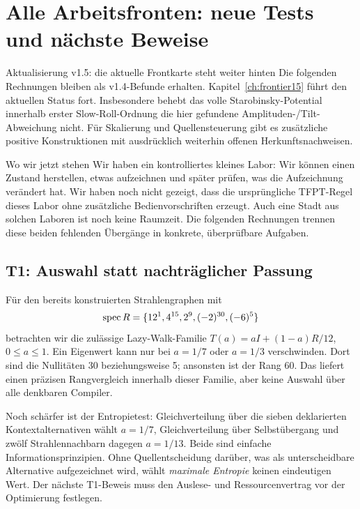 \chapter{Alle Arbeitsfronten: neue Tests und nächste Beweise}
\label{ch:fronts14}
\begin{grenze}{Aktualisierung v1.5: die aktuelle Frontkarte steht weiter hinten}
Die folgenden Rechnungen bleiben als v1.4-Befunde erhalten. Kapitel~\ref{ch:frontier15} führt den aktuellen Status fort. Insbesondere behebt das volle Starobinsky-Potential innerhalb erster Slow-Roll-Ordnung die hier gefundene Amplituden-/Tilt-Abweichung nicht. Für Skalierung und Quellensteuerung gibt es zusätzliche positive Konstruktionen mit ausdrücklich weiterhin offenen Herkunftsnachweisen.
\end{grenze}

\begin{bild}{Wo wir jetzt stehen}
Wir haben ein kontrolliertes kleines Labor: Wir können einen Zustand herstellen, etwas aufzeichnen und später prüfen, was die Aufzeichnung verändert hat. Wir haben noch nicht gezeigt, dass die ursprüngliche TFPT-Regel dieses Labor ohne zusätzliche Bedienvorschriften erzeugt. Auch eine Stadt aus solchen Laboren ist noch keine Raumzeit. Die folgenden Rechnungen trennen diese beiden fehlenden Übergänge in konkrete, überprüfbare Aufgaben.
\end{bild}

\section{T1: Auswahl statt nachträglicher Passung}
Für den bereits konstruierten Strahlengraphen mit
\begin{equation}
\operatorname{spec} R=\{12^1,4^{15},2^9,(-2)^{30},(-6)^5\}
\end{equation}
betrachten wir die zulässige Lazy-Walk-Familie $T(a)=aI+(1-a)R/12$, $0\le a\le1$. Ein Eigenwert kann nur bei $a=1/7$ oder $a=1/3$ verschwinden. Dort sind die Nullitäten 30 beziehungsweise 5; ansonsten ist der Rang 60. Das liefert einen präzisen Rangvergleich innerhalb dieser Familie, aber keine Auswahl über alle denkbaren Compiler.

Noch schärfer ist der Entropietest: Gleichverteilung über die sieben deklarierten Kontextalternativen wählt $a=1/7$, Gleichverteilung über Selbstübergang und zwölf Strahlennachbarn dagegen $a=1/13$. Beide sind einfache Informationsprinzipien. Ohne Quellentscheidung darüber, was als unterscheidbare Alternative aufgezeichnet wird, wählt \emph{maximale Entropie} keinen eindeutigen Wert. Der nächste T1-Beweis muss den Auslese- und Ressourcenvertrag vor der Optimierung festlegen.

